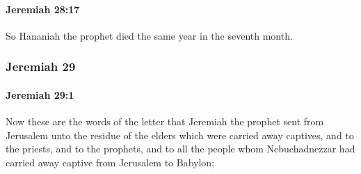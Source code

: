 		\paragraph{Jeremiah 28:17} %
			\label{JEREMIAH-28-17}

			So Hananiah the prophet died the same year in the seventh month.

	\subsubsection{Jeremiah 29} %
		\label{JEREMIAH-29}

		\paragraph{Jeremiah 29:1} %
			\label{JEREMIAH-29-1}

			Now these are the words of the letter that Jeremiah the prophet sent from Jerusalem unto the residue of the elders which were carried away captives, and to the priests, and to the prophets, and to all the people whom Nebuchadnezzar had carried away captive from Jerusalem to Babylon;

